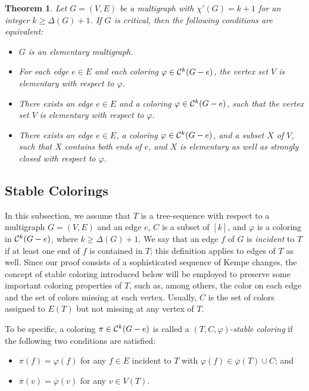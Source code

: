 \documentclass[11pt]{article}
\newtheorem{theorem}{Theorem}[section]
\begin{document}
\begin{theorem} \label{egraph2}
Let $G=(V,E)$ be a multigraph with $\chi'(G)=k+1$ for an integer $k \ge \Delta(G)+1$. If $G$ is critical, then the 
following conditions are equivalent:
\begin{itemize}
\vspace{-2mm}
\item[(i)] $G$ is an elementary multigraph.
\vspace{-2mm}
\item[(ii)] For each edge $e\in E$ and each coloring $\varphi \in {\cal C}^k(G-e)$, the vertex set $V$ is elementary
with respect to $\varphi$.
\vspace{-2mm}
\item[(iii)] There exists an edge $e\in E$ and a coloring $\varphi \in {\cal C}^k(G-e)$, such that the vertex set $V$ 
is elementary with respect to $\varphi$.
\vspace{-2mm}
\item[(iv)] There exists an edge $e\in E$, a coloring $\varphi \in {\cal C}^k(G-e)$, and a subset $X$ of $V$, 
such that $X$ contains both ends of $e$, and $X$ is elementary as well as strongly closed with respect to $\varphi$.
\end{itemize}
\end{theorem} 

\subsection{Stable Colorings}

\vskip 2mm
In this subsection, we assume that $T$ is a tree-sequence with respect to a multigraph $G=(V,E)$ and an edge $e$, 
$C$ is a subset of $[k]$, and $\varphi$ is a coloring in ${\cal C}^k(G-e)$, where $k \ge \Delta(G)+1$. We say
that an edge $f$ of $G$ is {\em incident} to $T$ if at least one end of $f$ is contained in $T$; this definition
applies to edges of $T$ as well.  Since our proof consists of a sophisticated sequence of Kempe changes, 
the concept of stable coloring introduced below will be employed to preserve some important coloring properties 
of $T$, such as, among others, the color on each edge and the set of colors missing at each vertex. Usually, 
$C$ is the set of colors assigned to $E(T)$ but not missing at any vertex of $T$. 

To be specific, a coloring $\pi \in {\cal C}^k(G-e)$ is called a $(T, C, \varphi)$-{\em stable coloring}\label{tcstable} 
if the following two conditions are satisfied:
\begin{itemize}
\vspace{-2mm}
\item[$(i)$] $\pi(f) = \varphi(f)$ for any $f\in E$ incident to $T$ with $\varphi(f)\in \overline{\varphi}(T)\cup C$; and
\vspace{-2mm}
\item[$(ii)$] $\overline{\pi} (v) = \overline{\varphi}(v)$ for any $v\in V(T)$.
\end{itemize}
\end{document}
